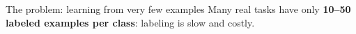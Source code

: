 
\newcommand{\fewshotpanel}{%
  \draw[uaigray!50, dashed] (0,-1.15) -- (0,1.15);
  \foreach \pt in {(-1.0,0.6),(-0.7,-0.5),(-1.3,-0.1)} {\node[real] at \pt {};}
  \foreach \pt in {(0.9,0.4),(1.2,-0.6),(0.6,-0.2)} {\node[realB] at \pt {};}
}
\begin{frame}{The problem: learning from very few examples}
\small
Many real tasks have only \textbf{10--50 labeled examples per class}: labeling is slow and costly.


\end{frame}
